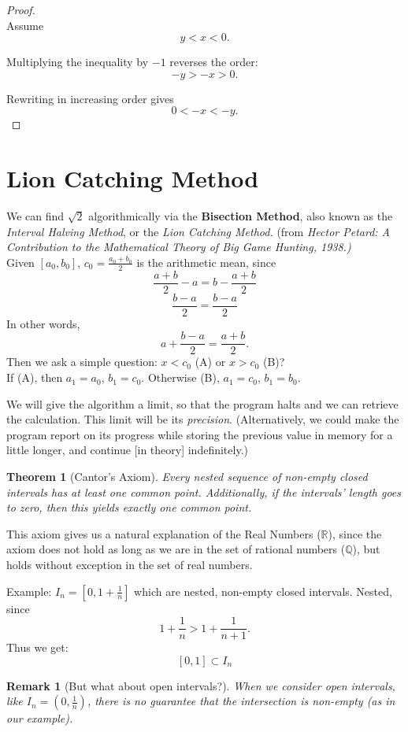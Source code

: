 \documentclass{article}
\newtheorem{theorem}{Theorem}
\newtheorem{remark}{Remark}
\begin{document}
\begin{proof}
\leavevmode \\

Assume
\[
y < x < 0.
\]

Multiplying the inequality by $-1$ reverses the order:
\[
-y > -x > 0.
\]

Rewriting in increasing order gives
\[
0 < -x < -y.
\]
\end{proof}

\section{Lion Catching Method}
We can find $\sqrt{2}$ algorithmically via the \textbf{Bisection Method}, also known as the \emph{Interval Halving Method}, or the \emph{Lion Catching Method.} (from \emph{Hector Petard: A Contribution to the Mathematical Theory of Big Game Hunting, 1938.)}\\
Given $[a_0, b_0]$, $c_0 = \frac{a_0 + b_0}{2}$ is the arithmetic mean, since
\[
    \frac{a + b}{2} - a = b - \frac{a+b}{2}
\]
\[
    \frac{b-a}{2} = \frac{b-a}{2}
\]
In other words,
\[
    a + \frac{b-a}{2} = \frac{a+b}{2}.
\]
Then we ask a simple question: $x < c_0$ (A) or $x > c_0$ (B)?\\
If (A), then $a_1 = a_0$, $b_1 = c_0$. Otherwise (B), $a_1 = c_0$, $b_1 = b_0$.

We will give the algorithm a limit, so that the program halts and we can retrieve the calculation. This limit will be its \emph{precision}. (Alternatively, we could make the program report on its progress while storing the previous value in memory for a little longer, and continue [in theory] indefinitely.)

\begin{theorem}[Cantor's Axiom]
    Every nested sequence of non-empty closed intervals has at least one common point. Additionally, if the intervals' length goes to zero, then this yields \emph{exactly} one common point.
\end{theorem}
This axiom gives us a natural explanation of the Real Numbers ($\mathbb{R}$), since the axiom does not hold as long as we are in the set of rational numbers ($\mathbb{Q}$), but holds without exception in the set of real numbers.

Example: $I_n = [0, 1 + \frac{1}{n}]$ which are nested, non-empty closed intervals. Nested, since
\[
    1 + \frac{1}{n} > 1 + \frac{1}{n+1}.
\]
Thus we get:
\[
    [0, 1] \subset I_n
\]

\begin{remark}[But what about open intervals?]
When we consider open intervals, like $I_n = (0, \frac{1}{n})$, there is no guarantee that the intersection is non-empty (as in our example).
\end{remark}
\end{document}
